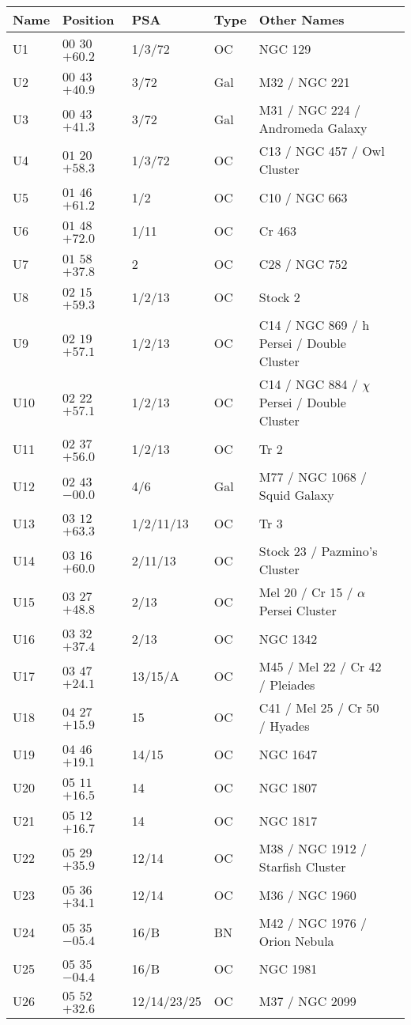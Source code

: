 \begin{table}[p]
\setlength{\tabcolsep}{3pt}
\scriptsize
\begin{tabular}{llllll}
\hline
Name&Position&PSA&Type&Other Names\\
\hline
U1&$00$ $30$ $+60.2$&1/3/72&OC&NGC 129\\
U2&$00$ $43$ $+40.9$&3/72&Gal&M32 / NGC 221\\
U3&$00$ $43$ $+41.3$&3/72&Gal&M31 / NGC 224 / Andromeda Galaxy\\
U4&$01$ $20$ $+58.3$&1/3/72&OC&C13 / NGC 457 / Owl Cluster\\
U5&$01$ $46$ $+61.2$&1/2&OC&C10 / NGC 663\\
U6&$01$ $48$ $+72.0$&1/11&OC&Cr 463\\
U7&$01$ $58$ $+37.8$&2&OC&C28 / NGC 752\\
U8&$02$ $15$ $+59.3$&1/2/13&OC&Stock 2\\
U9&$02$ $19$ $+57.1$&1/2/13&OC&C14 / NGC 869 / h Persei / Double Cluster\\
U10&$02$ $22$ $+57.1$&1/2/13&OC&C14 / NGC 884 / $\chi$ Persei / Double Cluster\\
U11&$02$ $37$ $+56.0$&1/2/13&OC&Tr 2\\
U12&$02$ $43$ $-00.0$&4/6&Gal&M77 / NGC 1068 / Squid Galaxy\\
U13&$03$ $12$ $+63.3$&1/2/11/13&OC&Tr 3\\
U14&$03$ $16$ $+60.0$&2/11/13&OC&Stock 23 / Pazmino's Cluster\\
U15&$03$ $27$ $+48.8$&2/13&OC&Mel 20 / Cr 15 / $\alpha$ Persei Cluster\\
U16&$03$ $32$ $+37.4$&2/13&OC&NGC 1342\\
U17&$03$ $47$ $+24.1$&13/15/A&OC&M45 / Mel 22 / Cr 42 / Pleiades\\
U18&$04$ $27$ $+15.9$&15&OC&C41 / Mel 25 / Cr 50 / Hyades\\
U19&$04$ $46$ $+19.1$&14/15&OC&NGC 1647\\
U20&$05$ $11$ $+16.5$&14&OC&NGC 1807\\
U21&$05$ $12$ $+16.7$&14&OC&NGC 1817\\
U22&$05$ $29$ $+35.9$&12/14&OC&M38 / NGC 1912 / Starfish Cluster\\
U23&$05$ $36$ $+34.1$&12/14&OC&M36 / NGC 1960\\
U24&$05$ $35$ $-05.4$&16/B&BN&M42 / NGC 1976 / Orion Nebula\\
U25&$05$ $35$ $-04.4$&16/B&OC&NGC 1981\\
U26&$05$ $52$ $+32.6$&12/14/23/25&OC&M37 / NGC 2099\\

\end{tabular}
\end{table}
